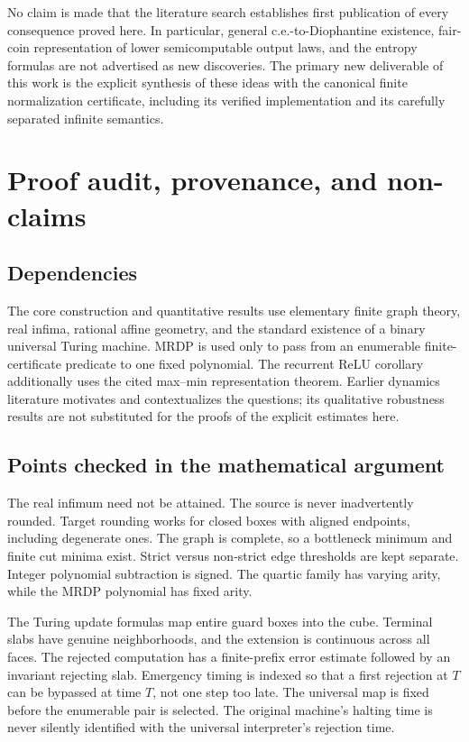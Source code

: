 \documentclass[11pt,letterpaper]{article}
\numberwithin{equation}{section}
\theoremstyle{definition}
\theoremstyle{remark}
\begin{document}
No claim is made that the literature search establishes first publication
of every consequence proved here. In particular, general c.e.-to-Diophantine
existence, fair-coin representation of lower semicomputable output laws,
and the entropy formulas are not advertised as new discoveries. The primary
new deliverable of this work is the explicit synthesis of these ideas with
the canonical finite normalization certificate, including its verified
implementation and its carefully separated infinite semantics.

\section{Proof audit, provenance, and non-claims}
\label{pqc:cb:app:audit}

\subsection{Dependencies}

The core construction and quantitative results use elementary finite graph
theory, real infima, rational affine geometry, and the standard existence of a
binary universal Turing machine.  MRDP is used only to pass from an enumerable
finite-certificate predicate to one fixed polynomial.  The recurrent ReLU
corollary additionally uses the cited max--min representation theorem.
Earlier dynamics literature motivates and contextualizes the questions; its
qualitative robustness results are not substituted for the proofs of the
explicit estimates here.

\subsection{Points checked in the mathematical argument}

The real infimum need not be attained.  The source is never inadvertently
rounded.  Target rounding works for closed boxes with aligned endpoints,
including degenerate ones.  The graph is complete, so a bottleneck minimum and
finite cut minima exist.  Strict versus non-strict edge thresholds are kept
separate.  Integer polynomial subtraction is signed.  The quartic family has
varying arity, while the MRDP polynomial has fixed arity.

The Turing update formulas map entire guard boxes into the cube.  Terminal
slabs have genuine neighborhoods, and the extension is continuous across all
faces.  The rejected computation has a finite-prefix error estimate followed
by an invariant rejecting slab.  Emergency timing is indexed so that a first
rejection at $T$ can be bypassed at time $T$, not one step too late.  The
universal map is fixed before the enumerable pair is selected.  The original
machine's halting time is never silently identified with the universal
interpreter's rejection time.
\end{document}
